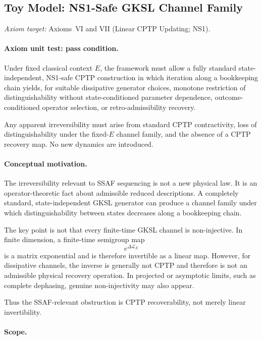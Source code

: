 \documentclass[aps,prx,onecolumn,11pt]{revtex4-2}
\theoremstyle{plain}
\theoremstyle{definition}
\theoremstyle{remark}
\begin{document}
\subsection{Toy Model: NS1-Safe GKSL Channel Family}
\label{toy:single_qubit_NS1_safe_GKSL_semigroup}

\noindent\emph{Axiom target:} Axioms~VI and VII (Linear CPTP Updating; NS1).

\paragraph{Axiom unit test: pass condition.}

Under fixed classical context \(E\), the framework must allow a fully
standard state-independent, NS1-safe CPTP construction in which
iteration along a bookkeeping chain yields, for suitable dissipative
generator choices, monotone restriction of distinguishability without
state-conditioned parameter dependence, outcome-conditioned operator
selection, or retro-admissibility recovery.

Any apparent irreversibility must arise from standard CPTP
contractivity, loss of distinguishability under the fixed-\(E\) channel
family, and the absence of a CPTP recovery map. No new dynamics are
introduced.

\paragraph{Conceptual motivation.}

The irreversibility relevant to SSAF sequencing is not a new physical
law. It is an operator-theoretic fact about admissible reduced
descriptions. A completely standard, state-independent GKSL generator
can produce a channel family under which distinguishability between
states decreases along a bookkeeping chain.

The key point is not that every finite-time GKSL channel is
non-injective. In finite dimension, a finite-time semigroup map
\[
e^{\Delta\mathcal L_E}
\]
is a matrix exponential and is therefore invertible as a linear map.
However, for dissipative channels, the inverse is generally not CPTP and
therefore is not an admissible physical recovery operation. In projected
or asymptotic limits, such as complete dephasing, genuine
non-injectivity may also appear.

Thus the SSAF-relevant obstruction is CPTP recoverability, not merely
linear invertibility.

\paragraph{Scope.}
\end{document}
